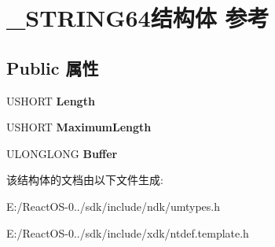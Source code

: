 \hypertarget{struct___s_t_r_i_n_g64}{}\section{\+\_\+\+S\+T\+R\+I\+N\+G64结构体 参考}
\label{struct___s_t_r_i_n_g64}
\subsection*{Public 属性}
\begin{DoxyCompactItemize}
\item 
\mbox{\label{struct___s_t_r_i_n_g64_ae3362cc96bc221aa5dc41e44d9b212d1}} 
U\+S\+H\+O\+RT {\bfseries Length}
\item 
\mbox{\label{struct___s_t_r_i_n_g64_ab82ad0eeaddbb37e73850d9815bc9c43}} 
U\+S\+H\+O\+RT {\bfseries Maximum\+Length}
\item 
\mbox{\label{struct___s_t_r_i_n_g64_aaabc632b7eaf6a2e998caa9b5ad4c285}} 
U\+L\+O\+N\+G\+L\+O\+NG {\bfseries Buffer}
\end{DoxyCompactItemize}


该结构体的文档由以下文件生成\+:\begin{DoxyCompactItemize}
\item 
E\+:/\+React\+O\+S-\/0../sdk/include/ndk/umtypes.\+h\item 
E\+:/\+React\+O\+S-\/0../sdk/include/xdk/ntdef.\+template.\+h\end{DoxyCompactItemize}
